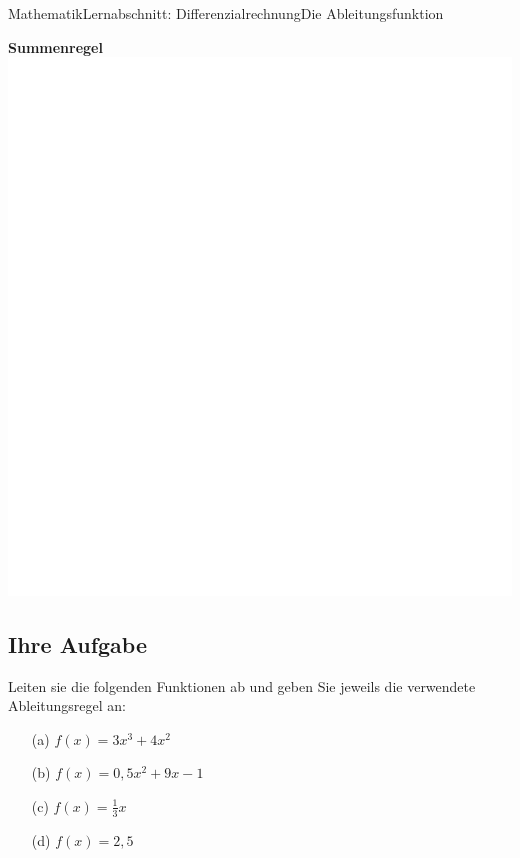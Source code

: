 \documentclass[11pt,twocolumn,oneside,openany,headings=optiontotoc,11pt,numbers=noenddot]{article}
\begin{document}
\begin{worksheet}{Mathematik}{Lernabschnitt: Differenzialrechnung}{Die Ableitungsfunktion}
		\par
		\textbf{Summenregel}\\
		\includegraphics[scale=0.1]{../../empty.jpg}\\
		\subsection*{Ihre Aufgabe}
		Leiten sie die folgenden Funktionen ab und geben Sie jeweils die verwendete Ableitungsregel an:
		\begin{itemize}
			\item[(a)] \(f(x) = 3x^3 + 4x^2\)
			\item[(b)] \(f(x) = 0,5x^2 + 9x - 1\)
			\item[(c)] \(f(x) = \frac{1}{3}x\)
			\item[(d)] \(f(x) = 2,5\)
		\end{itemize}		
	\end{worksheet}
\end{document}
